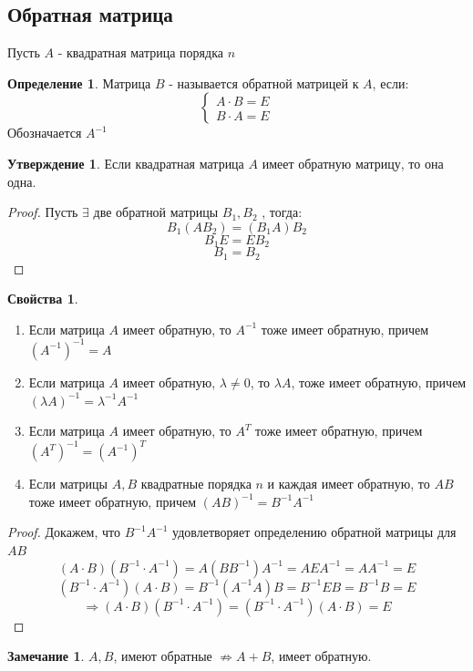 \documentclass[a4paper, 12pt]{article}
\newcommand\tab[1][.5cm]{\hspace*{#1}}
\theoremstyle{definition}
\newtheorem*{definition}{Определение}
\newtheorem*{subtheorem}{Утверждение}
\newtheorem*{remark}{Замечание}
\newtheorem*{properties}{Свойства}
\begin{document}
  \subsection{Обратная матрица}
  Пусть $A$ - квадратная матрица порядка $n$ 
  \begin{definition}
    Матрица $B$ - называется обратной матрицей к $A$, если:
    $$\begin{cases}
      A \cdot B = E \\
      B \cdot A = E
    \end{cases}$$
    Обозначается $A^{-1}$ 
  \end{definition} 
  \begin{subtheorem}
    Если квадратная матрица $A$ имеет обратную матрицу, то она одна. 
  \end{subtheorem} 
  \begin{proof}
    Пусть $\exists $ две обратной матрицы $B_1, B_2$ , тогда: 
    $$B_1(AB_2) = (B_1A)B_2$$ 
    $$B_1 E = E B_2$$
    $$B_1 = B_2$$  
  \end{proof} 
  \begin{properties}  \tab
    \begin{enumerate}
      \item Если матрица $A$ имеет обратную, то $A^{-1}$ тоже имеет обратную, причем \\$(A^{-1})^{-1} = A$ \label{pro1} 
      \item Если матрица $A$ имеет обратную, $\lambda \not =0$, то $\lambda A$, тоже имеет обратную, причем $(\lambda A)^{-1} = \lambda^{-1} A^{-1}$ 
      \item Если матрица $A$ имеет обратную, то $A^{T}$ тоже имеет обратную, причем \\$(A^{T})^{-1} = (A^{-1})^{T}$
      \item Если матрицы $A,B$ квадратные порядка $n$ и каждая имеет обратную, то $AB$ тоже имеет обратную, причем $(AB)^{-1} = B^{-1}A^{-1}$ \label{pro4} 
    \end{enumerate}
  \end{properties}
  \begin{proof}
    Докажем, что $B^{-1} A^{-1} $ удовлетворяет определению обратной матрицы для $AB$ 
    $$(A\cdot B)(B^{-1}\cdot A^{-1}) = A(BB^{-1})A^{-1} = AEA^{-1} = AA^{-1} = E$$
    $$(B^{-1}\cdot A^{-1})(A\cdot B) = B^{-1}(A^{-1}A)B = B^{-1}EB = B^{-1}B=E$$  
    $$\Longrightarrow (A\cdot B)(B^{-1}\cdot A^{-1}) = (B^{-1}\cdot A^{-1})(A\cdot B) = E$$ 
  \end{proof} 
  \begin{remark}
    $A,B$, имеют обратные $\not \Rightarrow A+B$, имеет обратную.
  \end{remark} 
\end{document}
